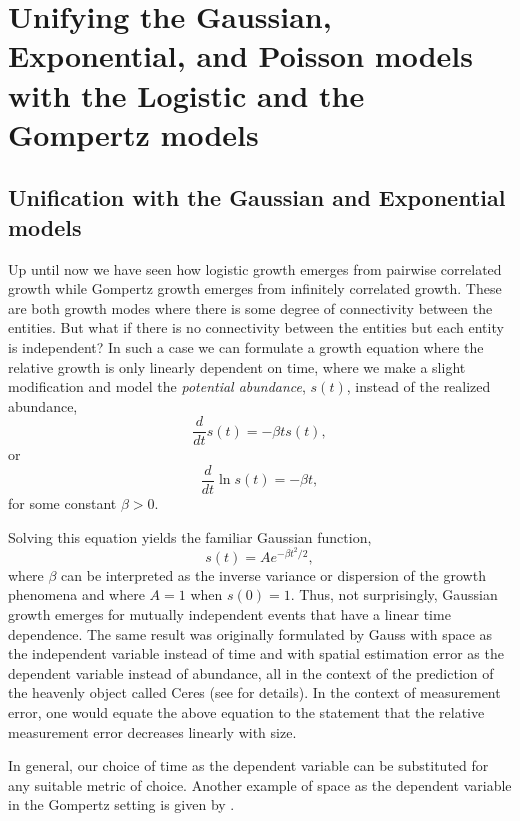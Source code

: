 \documentclass{article}
\begin{document}
\section{Unifying the Gaussian, Exponential, and Poisson models with the Logistic and the Gompertz models}

\subsection{Unification with the Gaussian and Exponential models}

Up until now we have seen how logistic growth emerges from pairwise correlated growth while Gompertz growth emerges from infinitely correlated growth. These are both growth modes where there is some degree of connectivity between the entities. But what if there is no connectivity between the entities but each entity is independent? In such a case we can formulate a growth equation where the relative growth is only linearly dependent on time, where we make a slight modification and model the \textit{potential abundance}, $s(t)$, instead of the realized abundance,
\begin{equation}
  \frac{d}{dt}s(t) = - \beta t s(t),
\end{equation}
or 
\begin{equation}
  \frac{d}{dt}\ln s(t) = - \beta t,
\end{equation}
for some constant $\beta>0$. 
 
Solving this equation yields the familiar Gaussian function, 
\begin{equation}
  s(t) = A e^{ - \beta t^2 / 2},
\end{equation}
where $\beta$ can be interpreted as the inverse variance or dispersion of the growth phenomena and where $A=1$ when $s(0)=1$. Thus, not surprisingly, Gaussian growth emerges for mutually independent events that have a linear time dependence. The same result was originally formulated by Gauss with space as the independent variable instead of time and with spatial estimation error as the dependent variable instead of abundance, all in the context of the prediction of the heavenly object called Ceres \cite{gauss1857theory} (see \cite{stahl2006evolution} for details). In the context of measurement error, one would equate the above equation to the statement that the relative measurement error decreases linearly with size. 

In general, our choice of time as the dependent variable can be substituted for any suitable metric of choice. Another example of space as the dependent variable in the Gompertz setting is given by \citet{molski2003coherent}.
\end{document}
